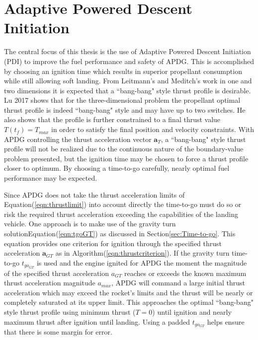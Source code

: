 \section{Adaptive Powered Descent Initiation} \label{sec:PDI}
The central focus of this thesis is the use of Adaptive Powered Descent Initiation (PDI) to improve the fuel performance and safety of APDG. This is accomplished by choosing an ignition time which results in superior propellant consumption while still allowing soft landing. From Leitmann's\:\cite{LEITMANN} and Meditch's\:\cite{MEDITCH} work in one and two dimensions it is expected that a ``bang-bang" style thrust profile is desirable. Lu 2017 \:\cite{LU} shows that for the three-dimensional problem the propellant optimal thrust profile is indeed ``bang-bang" style and may have up to two switches. He also shows that the profile is further constrained to a final thrust value $T(t_f) = T_{max}$ in order to satisfy the final position and velocity constraints. With APDG controlling the thrust acceleration vector $\bm{a}_T$, a ``bang-bang" style thrust profile will not be realized due to the continuous nature of the boundary-value problem presented, but the ignition time may be chosen to force a thrust profile closer to optimum. By choosing a time-to-go carefully, nearly optimal fuel performance may be expected. 

Since APDG does not take the thrust acceleration limits of Equation\:(\ref{eqn:thrustlimit}) into account directly the time-to-go must do so or risk the required thrust acceleration exceeding the capabilities of the landing vehicle. One approach is to make use of the gravity turn solution\:Equation\:(\ref{eqn:tgoGT}) as discussed in Section\:\ref{sec:Time-to-go}. This equation provides one criterion for ignition through the specified thrust acceleration $\bm{a}_{GT}$ as in Algorithm\:(\ref{eqn:thrustcriterion}). If the gravity turn time-to-go $t_{go_{GT}}$ is used and the engine ignited for APDG the moment the magnitude of the specified thrust acceleration $a_{GT}$ reaches or exceeds the known maximum thrust acceleration magnitude $a_{max}$, APDG will command a large initial thrust acceleration which may exceed the rocket's limits and the thrust will be nearly or completely saturated at its upper limit. This approaches the optimal ``bang-bang" style thrust profile using minimum thrust ($T = 0$) until ignition and nearly maximum thrust after ignition until landing. Using a padded $t_{go_{GT}}$ helps ensure that there is some margin for error.




